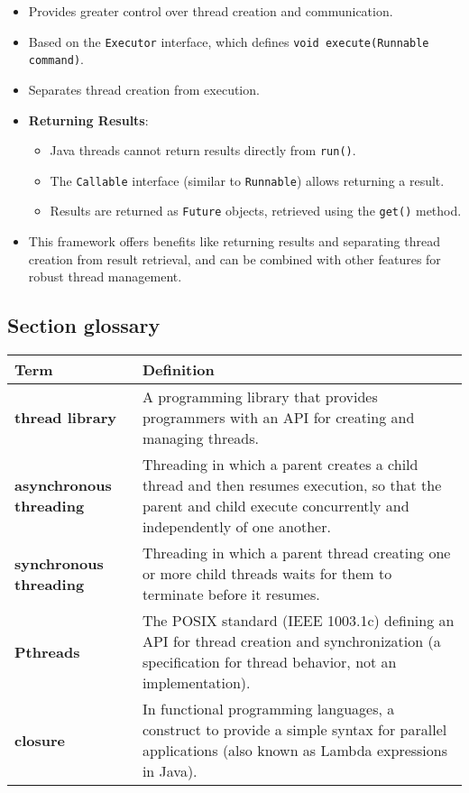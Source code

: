 \begin{itemize}
        \begin{itemize}
            \item Provides greater control over thread creation and communication.
            \item Based on the \texttt{Executor} interface, which defines \texttt{void execute(Runnable command)}.
            \item Separates thread creation from execution.
            \item \textbf{Returning Results}:
                \begin{itemize}
                    \item Java threads cannot return results directly from \texttt{run()}.
                    \item The \texttt{Callable} interface (similar to \texttt{Runnable}) allows returning a result.
                    \item Results are returned as \texttt{Future} objects, retrieved using the \texttt{get()} method.
                \end{itemize}
            \item This framework offers benefits like returning results and separating thread creation from result retrieval, and can be combined with other features for robust thread management.
        \end{itemize}
\end{itemize}

\subsection*{Section glossary}
\centering
\begin{tabular}{>{\raggedright}p{} >{\raggedright\arraybackslash}p{}}
\toprule
\textbf{Term} & \textbf{Definition} \\
\midrule
\textbf{thread library} & A programming library that provides programmers with an API for creating and managing threads. \\
\textbf{asynchronous threading} & Threading in which a parent creates a child thread and then resumes execution, so that the parent and child execute concurrently and independently of one another. \\
\textbf{synchronous threading} & Threading in which a parent thread creating one or more child threads waits for them to terminate before it resumes. \\
\textbf{Pthreads} & The POSIX standard (IEEE 1003.1c) defining an API for thread creation and synchronization (a specification for thread behavior, not an implementation). \\
\textbf{closure} & In functional programming languages, a construct to provide a simple syntax for parallel applications (also known as Lambda expressions in Java). \\
\end{tabular}
\vspace{\baselineskip}
